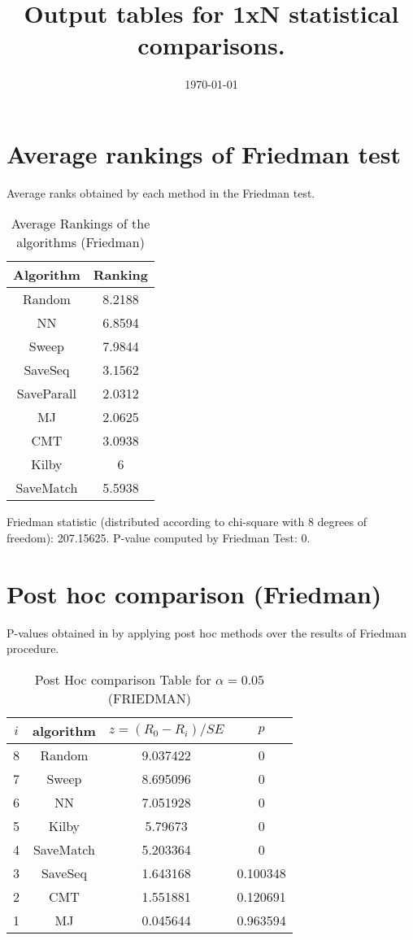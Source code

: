\documentclass[a4paper,10pt]{article}
\title{Output tables for 1xN statistical comparisons.}
\author{}
\date{\today}
\begin{document}
\begin{landscape}
\pagestyle{empty}
\maketitle
\thispagestyle{empty}

\section{Average rankings of Friedman test}


Average ranks obtained by each method in the Friedman test.

\begin{table}[!htp]
\centering
\begin{tabular}{|c|c|}\hline
Algorithm&Ranking\\\hline
Random&8.2188\\NN&6.8594\\Sweep&7.9844\\SaveSeq&3.1562\\SaveParall&2.0312\\MJ&2.0625\\CMT&3.0938\\Kilby&6\\SaveMatch&5.5938\\\hline\end{tabular}
\caption{Average Rankings of the algorithms (Friedman)}
\end{table}

Friedman statistic (distributed according to chi-square with 8 degrees of freedom): 207.15625. \newline P-value computed by Friedman Test: 0.\newline


\newpage

\section{Post hoc comparison (Friedman)}


P-values obtained in by applying post hoc methods over the results of Friedman procedure.

\begin{table}[!htp]
\centering\footnotesize
\begin{tabular}{cccc}
$i$&algorithm&$z=(R_0 - R_i)/SE$&$p$\\
\hline8&Random&9.037422&0\\7&Sweep&8.695096&0\\6&NN&7.051928&0\\5&Kilby&5.79673&0\\4&SaveMatch&5.203364&0\\3&SaveSeq&1.643168&0.100348\\2&CMT&1.551881&0.120691\\1&MJ&0.045644&0.963594\\\hline
\end{tabular}
\caption{Post Hoc comparison Table for $\alpha=0.05$ (FRIEDMAN)}
\end{table}
\newpage


\end{landscape}
\end{document}
